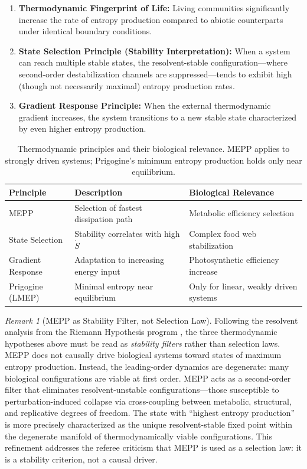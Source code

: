 \documentclass[12pt,a4paper]{article}
\theoremstyle{remark}
\newtheorem{remark}{Remark}
\begin{document}
\begin{enumerate}
    \item \textbf{Thermodynamic Fingerprint of Life:} Living communities significantly increase the rate of entropy production compared to abiotic counterparts under identical boundary conditions.

    \item \textbf{State Selection Principle (Stability Interpretation):} When a system can reach multiple stable states, the resolvent-stable configuration---where second-order destabilization channels are suppressed---tends to exhibit high (though not necessarily maximal) entropy production rates.

    \item \textbf{Gradient Response Principle:} When the external thermodynamic gradient increases, the system transitions to a new stable state characterized by even higher entropy production.
\end{enumerate}

\begin{table}[ht]
\centering
\caption{Thermodynamic principles and their biological relevance. MEPP applies to strongly driven systems; Prigogine's minimum entropy production holds only near equilibrium.}
\label{tab:thermo-principles}
\begin{tabular}{lll}
\toprule
\textbf{Principle} & \textbf{Description} & \textbf{Biological Relevance} \\
\midrule
MEPP & Selection of fastest dissipation path & Metabolic efficiency selection \\
State Selection & Stability correlates with high $\dot{S}$ & Complex food web stabilization \\
Gradient Response & Adaptation to increasing energy input & Photosynthetic efficiency increase \\
Prigogine (LMEP) & Minimal entropy near equilibrium & Only for linear, weakly driven systems \\
\bottomrule
\end{tabular}
\end{table}

\begin{remark}[MEPP as Stability Filter, not Selection Law]
\label{rem:mepp-stability-biology}
Following the resolvent analysis from the Riemann Hypothesis program \citep{FST-RH2}, the three thermodynamic hypotheses above must be read as \emph{stability filters} rather than selection laws. MEPP does not causally drive biological systems toward states of maximum entropy production. Instead, the leading-order dynamics are degenerate: many biological configurations are viable at first order. MEPP acts as a second-order filter that eliminates resolvent-unstable configurations---those susceptible to perturbation-induced collapse via cross-coupling between metabolic, structural, and replicative degrees of freedom. The state with ``highest entropy production'' is more precisely characterized as the unique resolvent-stable fixed point within the degenerate manifold of thermodynamically viable configurations. This refinement addresses the referee criticism that MEPP is used as a selection law: it is a stability criterion, not a causal driver.
\end{remark}
\end{document}
